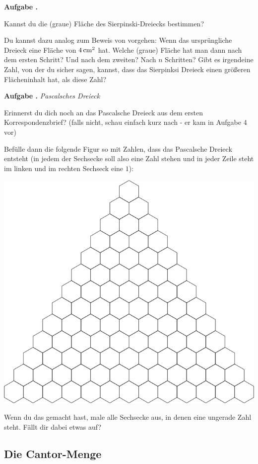 \documentclass[a4paper,ngerman,12pt]{scrartcl}
\theoremstyle{definition}
\theoremstyle{plain}
\theoremstyle{remark}
\newlength{\aufgabenskip}
\newcounter{aufgabennummer}
\newenvironment{aufgabe}[1]{
  \addtocounter{aufgabennummer}{1}
  \textbf{Aufgabe \theaufgabennummer.} \emph{#1} \par
}{\vspace{\aufgabenskip}}
\begin{document}
\begin{aufgabe}{}
	Kannst du die (graue) Fläche des Sierpinski-Dreiecks bestimmen? 
	
	Du kannst dazu analog zum Beweis von  vorgehen: Wenn das ursprüngliche Dreieck eine Fläche von $\unit[4]{cm^2}$ hat. Welche (graue) Fläche hat man dann nach dem ersten Schritt? Und nach dem zweiten? Nach $n$ Schritten? Gibt es irgendeine Zahl, von der du sicher sagen, kannst, dass das Sierpinksi Dreieck einen größeren Flächeninhalt hat, als diese Zahl?
\end{aufgabe}

\begin{aufgabe}{Pascalsches Dreieck}
	Erinnerst du dich noch an das Pascalsche Dreieck aus dem ersten Korrespondenzbrief? (falls nicht, schau einfach kurz nach - er kam in Aufgabe 4 vor)
	
	Befülle dann die folgende Figur so mit Zahlen, dass das Pascalsche Dreieck entsteht (in jedem der Sechsecke soll also eine Zahl stehen und in jeder Zeile steht im linken und im rechten Sechseck eine $1$):
	\begin{center}
			\includegraphics{Bilder/pascal-triangle.png}
	\end{center}
	Wenn du das gemacht hast, male alle Sechsecke aus, in denen eine ungerade Zahl steht. Fällt dir dabei etwas auf?
\end{aufgabe}


\subsection{Die Cantor-Menge}\label{aufgabe:Cantor-Menge}
\end{document}

